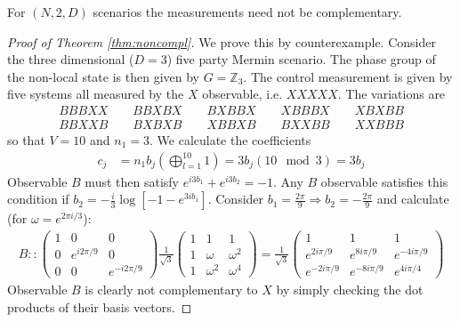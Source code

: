 \begin{theorem}
\label{thm:noncompl}
For $(N,2,D)$ scenarios the measurements need not be complementary.
\end{theorem}
\begin{proof}[Proof of Theorem \ref{thm:noncompl}]
We prove this by counterexample.  Consider the three dimensional  ($D=3$) five party Mermin scenario.  The phase group of the non-local state is then given by $G=\mathbb{Z}_3$.
The control measurement is given by five systems all measured by the $X$ observable, i.e. $XXXXX$. The variations are
\begin{align*}
BBBXX \qquad BBXBX \qquad BXBBX \qquad XBBBX \qquad XBXBB \\
BBXXB \qquad BXBXB \qquad XBBXB \qquad BXXBB \qquad XXBBB
\end{align*}
so that $V = 10$ and $n_1 = 3$. We calculate the coefficients
\begin{align*} c_j &= n_1 b_j \left(\bigoplus^{10}_{l=1}1\right)= 3b_j (10\mod 3) = 3b_j
\end{align*}
Observable $B$ must then satisfy $e^{i3b_1}+e^{i3b_2} = -1$. Any $B$ observable satisfies this condition if  $b_2 = -\frac{i}{3}\log\left[-1-e^{3ib_1}\right]$.
Consider $b_1 = \frac{2\pi}{9} \Rightarrow b_2 =- \frac{2\pi}{9}$ and calculate (for $\omega = e^{2\pi i/3}$):
\begin{align*}
B :: \left(\begin{array}{ccc}1 & 0 & 0 \\ 0 & e^{i2\pi/9} & 0 \\ 0 & 0 & e^{-i2\pi/9} \end{array}\right) \frac{1}{\sqrt{3}}
\left(\begin{array}{ccc}1 & 1 & 1 \\ 1 & \omega & \omega^2 \\ 1 & \omega^2 & \omega^4  \end{array}\right) 
= \frac{1}{\sqrt{3}}\left(\begin{array}{ccc}1 & 1 & 1 \\ e^{2i\pi/9} & e^{8i\pi/9} & e^{-4i\pi/9} \\ e^{-2i\pi/9} & e^{-8i\pi/9} & e^{4i\pi/4} \end{array}\right)
\end{align*}
Observable $B$ is clearly not complementary to $X$ by simply checking the dot products of their basis vectors.
\end{proof}

